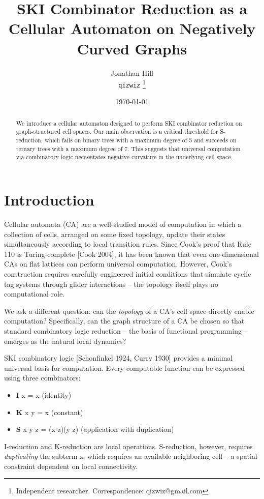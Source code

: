 \documentclass[11pt]{article}
\title{SKI Combinator Reduction as a Cellular Automaton on Negatively Curved Graphs}
\author{Jonathan Hill\\
\texttt{qizwiz} \thanks{Independent researcher. Correspondence: qizwiz@gmail.com}}
\date{\today}
\begin{document}
\maketitle

\begin{abstract}
We introduce a cellular automaton designed to perform SKI combinator reduction on graph-structured cell spaces. Our main observation is a critical threshold for S-reduction, which fails on binary trees with a maximum degree of 5 and succeeds on ternary trees with a maximum degree of 7. This suggests that universal computation via combinatory logic necessitates negative curvature in the underlying cell space.
\end{abstract}

\section{Introduction}

Cellular automata (CA) are a well-studied model of computation in which a collection of cells, arranged on some fixed topology, update their states simultaneously according to local transition rules. Since Cook's proof that Rule 110 is Turing-complete [Cook 2004], it has been known that even one-dimensional CAs on flat lattices can perform universal computation. However, Cook's construction requires carefully engineered initial conditions that simulate cyclic tag systems through glider interactions -- the topology itself plays no computational role.

We ask a different question: can the \textit{topology} of a CA's cell space directly enable computation? Specifically, can the graph structure of a CA be chosen so that standard combinatory logic reduction -- the basis of functional programming -- emerges as the natural local dynamics?

SKI combinatory logic [Schonfinkel 1924, Curry 1930] provides a minimal universal basis for computation. Every computable function can be expressed using three combinators:
\begin{itemize}
\item \textbf{I} x = x (identity)
\item \textbf{K} x y = x (constant)
\item \textbf{S} x y z = (x z)(y z) (application with duplication)
\end{itemize}

I-reduction and K-reduction are local operations. S-reduction, however, requires \textit{duplicating} the subterm z, which requires an available neighboring cell -- a spatial constraint dependent on local connectivity.
\end{document}
